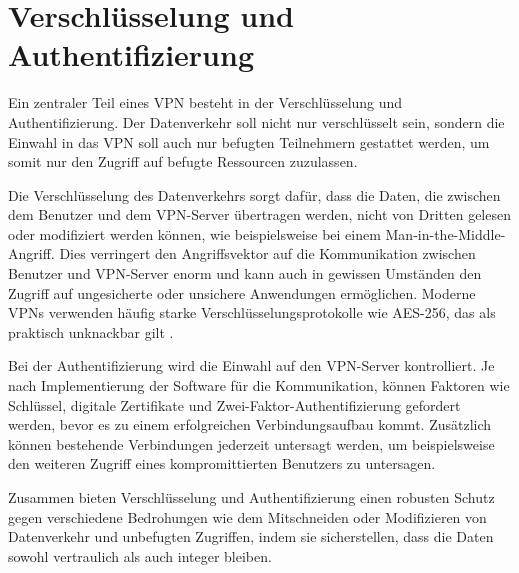 \section{Verschlüsselung und Authentifizierung}

Ein zentraler Teil eines \gls{VPN} besteht in der Verschlüsselung und Authentifizierung. Der Datenverkehr soll nicht nur verschlüsselt sein, sondern die Einwahl in das \gls{VPN} soll auch nur befugten Teilnehmern gestattet werden, um somit nur den Zugriff auf befugte Ressourcen zuzulassen. 

Die Verschlüsselung des Datenverkehrs sorgt dafür, dass die Daten, die zwischen dem Benutzer und dem \gls{VPN}-Server übertragen werden, nicht von Dritten gelesen oder modifiziert werden können, wie beispielsweise bei einem Man-in-the-Middle-Angriff. Dies verringert den Angriffsvektor auf die Kommunikation zwischen Benutzer und \gls{VPN}-Server enorm und kann auch in gewissen Umständen den Zugriff auf ungesicherte oder unsichere Anwendungen ermöglichen. Moderne \gls{VPN}s verwenden häufig starke Verschlüsselungsprotokolle wie \gls{AES}-256, das als praktisch unknackbar gilt \cite{BSI_Recommendations_and_key_lengths}.

Bei der Authentifizierung wird die Einwahl auf den \gls{VPN}-Server kontrolliert. Je nach Implementierung der Software für die Kommunikation, können Faktoren wie Schlüssel, digitale Zertifikate und Zwei-Faktor-Authentifizierung gefordert werden, bevor es zu einem erfolgreichen Verbindungsaufbau kommt. Zusätzlich können bestehende Verbindungen jederzeit untersagt werden, um beispielsweise den weiteren Zugriff eines kompromittierten Benutzers zu untersagen. 

Zusammen bieten Verschlüsselung und Authentifizierung einen robusten Schutz gegen verschiedene Bedrohungen wie dem Mitschneiden oder Modifizieren von Datenverkehr und unbefugten Zugriffen, indem sie sicherstellen, dass die Daten sowohl vertraulich als auch integer bleiben.